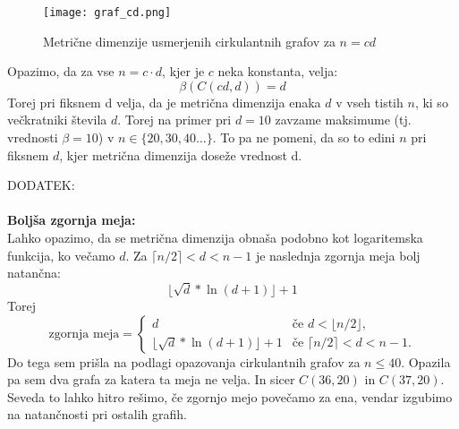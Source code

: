 \documentclass[a4paper,12pt]{article}
\theoremstyle{definition}
\theoremstyle{remark}
\theoremstyle{definition}
\begin{document}
\begin{figure}[H]  
    \centering
    \texttt{[image: graf\_cd.png]}  
    \caption{Metrične dimenzije usmerjenih cirkulantnih grafov za $n = cd$} 
    \label{fig:screenshot}  
\end{figure}

\noindent
Opazimo, da za vse $n = c \cdot d$, kjer je $c$ neka konstanta, velja:
\[
    \beta(C(cd, d)) = d
\]
\noindent
Torej pri fiksnem d velja, da je metrična dimenzija enaka $d$ v vseh tistih $n$, ki so večkratniki števila $d$.
Torej na primer pri $d = 10$ zavzame maksimume (tj. vrednosti $\beta = 10$) v $ n \in \{20, 30, 40 \dots\} $.
To pa ne pomeni, da so to edini $n$ pri fiksnem $d$, kjer metrična dimenzija doseže vrednost d. 

\newpage
\noindent
DODATEK:\\
\\
\noindent
\textbf{Boljša zgornja meja:}\\
\noindent
Lahko opazimo, da se metrična dimenzija obnaša podobno kot logaritemska funkcija, ko večamo $d$.
Za $ \lceil n/2 \rceil < d < n-1$ je naslednja zgornja meja bolj natančna:
\[ \lfloor \sqrt{d}*\ln(d + 1) \rfloor + 1  
\]
\noindent
Torej
\[
\text{zgornja meja} = 
\begin{cases} 
d & \text{če } d < \lfloor n/2 \rfloor, \\
\lfloor \sqrt{d}*\ln(d + 1) \rfloor + 1   & \text{če } \lceil n/2 \rceil < d < n-1.
\end{cases}
\]
\noindent
Do tega sem prišla na podlagi opazovanja cirkulantnih grafov za $n \leqslant 40$. 
Opazila pa sem dva grafa za katera ta meja ne velja. In sicer $C(36,20)$ in $C(37,20)$. Seveda 
to lahko hitro rešimo, če zgornjo mejo povečamo za ena, vendar izgubimo na natančnosti pri ostalih grafih.
\end{document}
